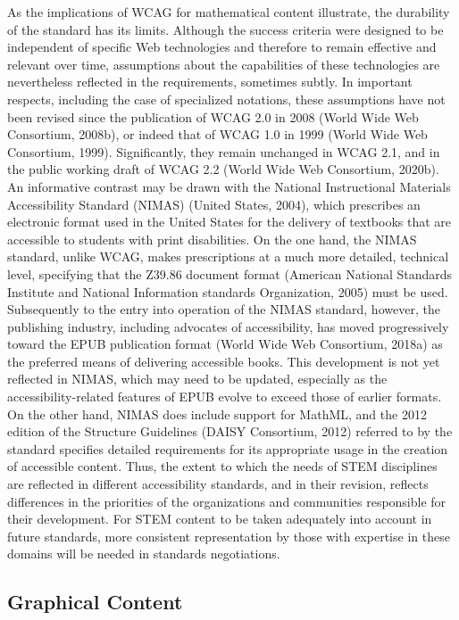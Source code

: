 \documentclass{sig-alternate} %
\begin{document}
\begin{large}
As the implications of WCAG for mathematical content illustrate, the durability of the standard has its limits. Although the success criteria were designed to be independent of specific Web technologies and therefore to remain effective and relevant over time, assumptions about the capabilities of these technologies are nevertheless reflected in the requirements, sometimes subtly. In important respects, including the case of specialized notations, these assumptions have not been revised since the publication of WCAG 2.0 in 2008 (World Wide Web Consortium, 2008b), or indeed that of WCAG 1.0 in 1999 (World Wide Web Consortium, 1999). Significantly, they remain unchanged in WCAG 2.1, and in the public working draft of WCAG 2.2 (World Wide Web Consortium, 2020b). An informative contrast may be drawn with the National Instructional Materials Accessibility Standard (NIMAS) (United States, 2004), which prescribes an electronic format used in the United States for the delivery of textbooks that are accessible to students with print disabilities. On the one hand, the NIMAS standard, unlike WCAG, makes prescriptions at a much more detailed, technical level, specifying that the Z39.86 document format (American National Standards Institute and National Information standards Organization, 2005) must be used. Subsequently to the entry into operation of the NIMAS standard, however, the publishing industry, including advocates of accessibility, has moved progressively toward the EPUB publication format (World Wide Web Consortium, 2018a) as the preferred means of delivering accessible books. This development is not yet reflected in NIMAS, which may need to be updated, especially as the accessibility-related features of EPUB evolve to exceed those of earlier formats. On the other hand, NIMAS does include support for MathML, and the 2012 edition of the Structure Guidelines (DAISY Consortium, 2012) referred to by the standard specifies detailed requirements for its appropriate usage in the creation of accessible content. Thus, the extent to which the needs of STEM disciplines are reflected in different accessibility standards, and in their revision, reflects differences in the priorities of the organizations and communities responsible for their development. For STEM content to be taken adequately into account in future standards, more consistent representation by those with expertise in these domains will be needed in standards negotiations.

\subsection*{Graphical Content}


\end{large}
\end{document}
